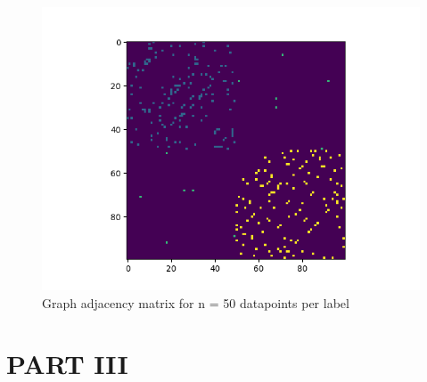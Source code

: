 \documentclass[12pt]{article}
\begin{document}
\begin{figure}[h]
\centering
\includegraphics[scale = 0.5]{outputs/part2/graph_label_diagram.png}
\caption{Graph adjacency matrix for n = 50 datapoints per label}
\label{Fig 14}
\end{figure}

\newpage

\section{PART III}
\end{document}
